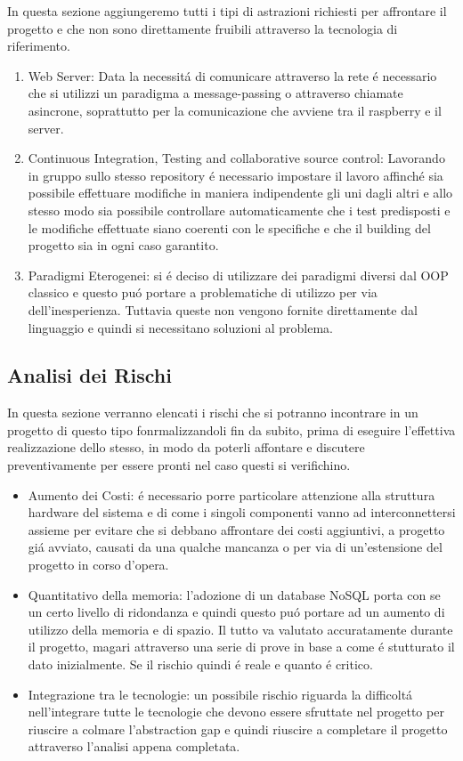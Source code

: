 In questa sezione aggiungeremo tutti i tipi di astrazioni richiesti per affrontare il progetto e che non sono direttamente fruibili attraverso la tecnologia di riferimento.

\begin{enumerate}
  \item Web Server: Data la necessit\'a di comunicare attraverso la rete \'e necessario che si utilizzi un paradigma a message-passing o attraverso chiamate asincrone, soprattutto per la comunicazione che avviene tra il raspberry e il server.
  \item Continuous Integration, Testing and collaborative source control: Lavorando in gruppo sullo stesso repository \'e necessario impostare il lavoro affinch\'e sia possibile effettuare modifiche in maniera indipendente gli uni dagli altri e allo stesso modo sia possibile controllare automaticamente che i test predisposti e le modifiche effettuate siano coerenti con le specifiche e che il building del progetto sia in ogni caso garantito.
  \item{Paradigmi Eterogenei}: si \'e deciso di utilizzare dei paradigmi diversi dal OOP classico e questo pu\'o portare a problematiche di utilizzo per via dell'inesperienza. Tuttavia queste non vengono fornite direttamente dal linguaggio e quindi si necessitano soluzioni al problema.
\end{enumerate}

\subsection{Analisi dei Rischi}

In questa sezione verranno elencati i rischi che si potranno incontrare in un progetto di questo tipo fonrmalizzandoli fin da subito, prima di eseguire l'effettiva realizzazione dello stesso, in modo da poterli affontare e discutere preventivamente per essere pronti nel caso questi si verifichino.

\begin{itemize}
  \item Aumento dei Costi: \'e necessario porre particolare attenzione alla struttura hardware del sistema e di come i singoli componenti vanno ad interconnettersi assieme per evitare che si debbano affrontare dei costi aggiuntivi, a progetto gi\'a avviato, causati da una qualche mancanza o per via di un'estensione del progetto in corso d'opera.
  \item Quantitativo della memoria: l'adozione di un database NoSQL porta con se un certo livello di ridondanza e quindi questo pu\'o portare ad un aumento di utilizzo della memoria e di spazio. Il tutto va valutato accuratamente durante il progetto, magari attraverso una serie di prove in base a come \'e stutturato il dato inizialmente. Se il rischio quindi \'e reale e quanto \'e critico.
  \item Integrazione tra le tecnologie: un possibile rischio riguarda la difficolt\'a nell'integrare tutte le tecnologie che devono essere sfruttate nel progetto per riuscire a colmare l'abstraction gap e quindi riuscire a completare il progetto attraverso l'analisi appena completata.
\end{itemize}
